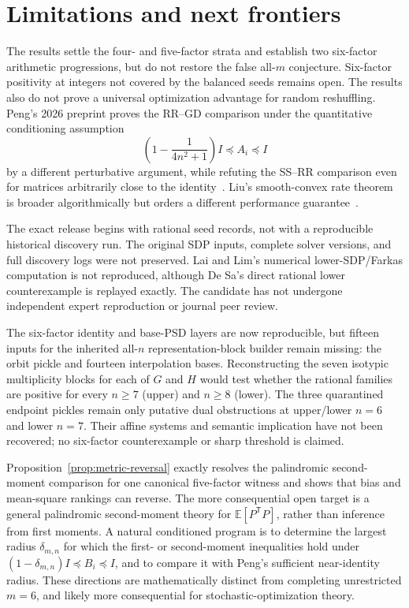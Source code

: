 \documentclass[11pt]{article}
\begin{document}
\section{Limitations and next frontiers}\label{sec:limitations}

The results settle the four- and five-factor strata and establish two
six-factor arithmetic progressions, but do not restore the false all-\(m\)
conjecture.  Six-factor positivity at integers not covered by the balanced
seeds remains open.  The results also do not prove a universal optimization
advantage for random reshuffling.  Peng's 2026 preprint proves the RR--GD
comparison under the quantitative conditioning assumption
\[
 \left(1-\frac1{4n^2+1}\right)I\preceq A_i\preceq I
\]
by a different perturbative argument, while refuting the SS--RR comparison
even for matrices arbitrarily close to the identity~\cite{Peng2026}.  Liu's
smooth-convex rate theorem is broader algorithmically but orders a different
performance guarantee~\cite{Liu2026}.

The exact release begins with rational seed records, not with a reproducible historical discovery run.  The original SDP inputs, complete solver versions, and full discovery logs were not preserved.  Lai and Lim's numerical lower-SDP/Farkas computation is not reproduced, although De Sa's direct rational lower counterexample is replayed exactly.  The candidate has not undergone independent expert reproduction or journal peer review.

The six-factor identity and base-PSD layers are now reproducible, but fifteen
inputs for the inherited all-\(n\) representation-block builder remain
missing: the orbit pickle and fourteen interpolation bases.  Reconstructing
the seven isotypic multiplicity blocks for each of \(G\) and \(H\) would test
whether the rational families are positive for every \(n\ge7\) (upper) and
\(n\ge8\) (lower).  The three quarantined endpoint pickles remain only
putative dual obstructions at upper/lower \(n=6\) and lower \(n=7\).
Their affine systems and semantic implication have not been recovered; no
six-factor counterexample or sharp threshold is claimed.

Proposition~\ref{prop:metric-reversal} exactly resolves the palindromic
second-moment comparison for one canonical five-factor witness and shows that
bias and mean-square rankings can reverse.  The more consequential open target
is a general palindromic second-moment theory for
\(\mathbb E[P^{\mathsf T}P]\), rather than inference from first moments.  A
natural conditioned program is to determine the largest radius
\(\delta_{m,n}\) for which the first- or second-moment inequalities hold under
\((1-\delta_{m,n})I\preceq B_i\preceq I\), and to compare it with Peng's
sufficient near-identity radius.  These directions are mathematically
distinct from completing unrestricted \(m=6\), and likely more consequential
for stochastic-optimization theory.
\end{document}
